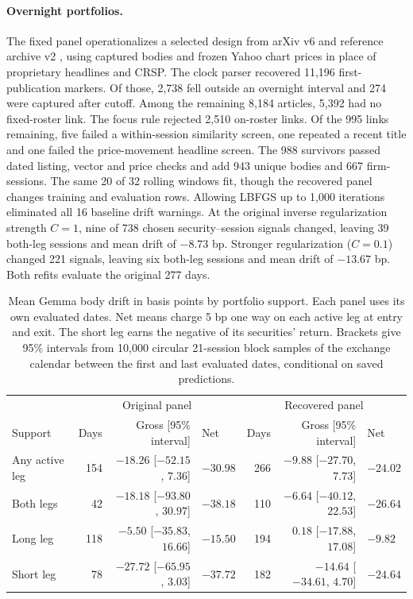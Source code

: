 \paragraph{Overnight portfolios.}
The fixed panel operationalizes a selected design from arXiv v6 and
reference archive v2 \citep{lopez2025v6,lopez2026archive}, using captured
bodies and frozen Yahoo chart prices in place of proprietary headlines
and CRSP. The clock parser recovered 11,196 first-publication markers.
Of those, 2,738 fell outside an overnight interval and 274 were captured
after cutoff. Among the remaining 8,184 articles, 5,392 had no fixed-roster
link. The focus rule rejected 2,510 on-roster links. Of the 995 links
remaining, five failed a within-session similarity screen, one repeated
a recent title and one failed the price-movement headline screen. The
988 survivors passed dated listing, vector and price checks and add
943 unique bodies and 667 firm-sessions. The same 20 of 32 rolling
windows fit, though the recovered panel changes training and evaluation
rows. Allowing LBFGS up to 1,000 iterations eliminated all 16 baseline
drift warnings. At the original inverse regularization strength $C=1$,
nine of 738 chosen security--session signals changed, leaving 39 both-leg
sessions and mean drift of $-8.73$ bp. Stronger regularization
($C=0.1$) changed 221 signals, leaving six both-leg sessions and
mean drift of $-13.67$ bp. Both refits evaluate the original 277 days.

\begin{table}[t]
  \centering
  \small
  \caption{Mean Gemma body drift in basis points by portfolio support.
    Each panel uses its own evaluated dates. Net means charge 5 bp one
    way on each active leg at entry and exit. The short leg earns the
    negative of its securities' return. Brackets give 95\% intervals
    from 10,000 circular 21-session block samples of the exchange
    calendar between the first and last evaluated dates, conditional
  on saved predictions.}
  \label{tab:overnight-support}
  \begin{tabular}{lrrlrrl}
    \toprule
    & \multicolumn{3}{c}{Original panel} &
    \multicolumn{3}{c}{Recovered panel} \\
    Support & Days & Gross [95\% interval] & Net & Days & Gross [95\%
    interval] & Net \\
    \midrule
    Any active leg & 154 & $-18.26$ [$-52.15$, $7.36$] & $-30.98$
    & 266 & $-9.88$ [$-27.70$, $7.73$] & $-24.02$ \\
    Both legs & 42 & $-18.18$ [$-93.80$, $30.97$] & $-38.18$
    & 110 & $-6.64$ [$-40.12$, $22.53$] & $-26.64$ \\
    Long leg & 118 & $-5.50$ [$-35.83$, $16.66$] & $-15.50$
    & 194 & $0.18$ [$-17.88$, $17.08$] & $-9.82$ \\
    Short leg & 78 & $-27.72$ [$-65.95$, $3.03$] & $-37.72$
    & 182 & $-14.64$ [$-34.61$, $4.70$] & $-24.64$ \\
    \bottomrule
  \end{tabular}
\end{table}

